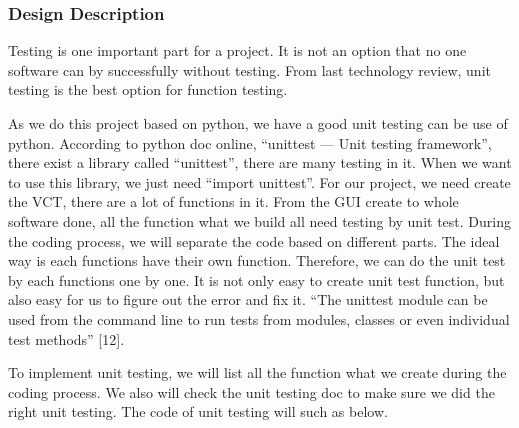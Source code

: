 \documentclass [10pt]{article}
\begin{document}
\subsubsection{Design Description}
Testing is one important part for a project. It is not an option that no one software can by successfully without testing. From last technology review, unit testing is the best option for function testing. \par
As we do this project based on python, we have a good unit testing can be use of python. According to python doc online, “unittest — Unit testing framework”, there exist a library called “unittest”, there are many testing in it. When we want to use this library, we just need “import unittest”. For our project, we need create the VCT, there are a lot of functions in it. From the GUI create to whole software done, all the function what we build all need testing by unit test. During the coding process, we will separate the code based on different parts. The ideal way is each functions have their own function. Therefore, we can do the unit test by each functions one by one. It is not only easy to create unit test function, but also easy for us to figure out the error and fix it. “The unittest module can be used from the command line to run tests from modules, classes or even individual test methods” [12]. \par
To implement unit testing, we will list all the function what we create during the coding process. We also will check the unit testing doc to make sure we did the right unit testing. The code of unit testing will such as below. \par
\end{document}
